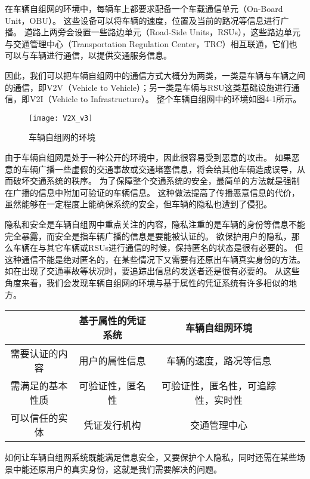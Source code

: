 在车辆自组网的环境中，每辆车上都要求配备一个车载通信单元（On-Board Unit，OBU）。
这些设备可以将车辆的速度，位置及当前的路况等信息进行广播。
道路上两旁会设置一些路边单元（Road-Side Units，RSUs），这些路边单元与交通管理中心（Transportation Regulation Center，TRC）相互联通，它们也可以与车辆进行通信，以提供交通服务信息。

因此，我们可以把车辆自组网中的通信方式大概分为两类，一类是车辆与车辆之间的通信，即V2V（Vehicle to Vehicle）；另一类是车辆与RSU这类基础设施进行通信，即V2I（Vehicle to Infrastructure）。
整个车辆自组网中的环境如图4-1所示。

\begin{figure}[h]
\centering
\texttt{[image: V2X\_v3]}
\caption{车辆自组网的环境}
\end{figure}

由于车辆自组网是处于一种公开的环境中，因此很容易受到恶意的攻击。
如果恶意的车辆广播一些虚假的交通事故或交通堵塞信息，将会给其他车辆造成误导，从而破坏交通系统的秩序。
为了保障整个交通系统的安全，最简单的方法就是强制在广播的信息中附加可验证的车辆信息。
这种做法提高了传播恶意信息的代价，虽然能够在一定程度上能确保系统的安全，但车辆的隐私也遭到了侵犯。

隐私和安全是车辆自组网中重点关注的内容，隐私注重的是车辆的身份等信息不能完全暴露，而安全是指车辆广播的信息是要能被认证的。
欲保护用户的隐私，那么车辆在与其它车辆或RSUs进行通信的时候，保持匿名的状态是很有必要的。
但这种通信不能是绝对匿名的，在某些情况下又需要有还原出车辆真实身份的方法。
如在出现了交通事故等状况时，要追踪出信息的发送者还是很有必要的。
从这些角度来看，我们会发现车辆自组网的环境与基于属性的凭证系统有许多相似的地方。

\begin{table}[htbp]
\vspace{0.5em}\centering\wuhao
\begin{tabular}{ccccc}
\toprule[1.5pt]
 & 基于属性的凭证系统 & 车辆自组网环境 \\
\midrule[1pt]
 需要认证的内容 & 用户的属性信息 & 车辆的速度，路况等信息 \\
 需满足的基本性质 & 可验证性，匿名性 & 可验证性，匿名性，可追踪性，实时性 \\
 可以信任的实体 & 凭证发行机构 & 交通管理中心 \\ 
\bottomrule[1.5pt]
\end{tabular}
\end{table}

如何让车辆自组网系统既能满足信息安全，又要保护个人隐私，同时还需在某些场景中能还原用户的真实身份，这就是我们需要解决的问题。

